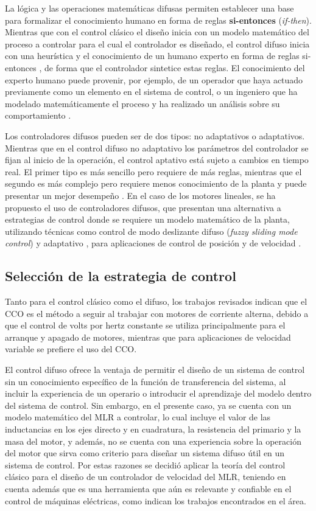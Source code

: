La lógica y las operaciones matemáticas difusas permiten establecer una base para formalizar el conocimiento humano en forma de reglas \textbf{si-entonces} (\textit{if-then}). Mientras que con el control clásico el diseño inicia con un modelo matemático del proceso a controlar para el cual el controlador es diseñado, el control difuso inicia con una heurística y el conocimiento de un humano experto en forma de reglas si-entonces \cite{wang1997}, de forma que el controlador sintetice estas reglas. El conocimiento del experto humano puede provenir, por ejemplo, de un operador que haya actuado previamente como un elemento en el sistema de control, o un ingeniero que ha modelado matemáticamente el proceso y ha realizado un análisis sobre su comportamiento \cite{passino1998}.

Los controladores difusos pueden ser de dos tipos: no adaptativos o adaptativos. Mientras que en el control difuso no adaptativo los parámetros del controlador se fijan al inicio de la operación, el control aptativo está sujeto a cambios en tiempo real. El primer tipo es más sencillo pero requiere de más reglas, mientras que el segundo es más complejo pero requiere menos conocimiento de la planta y puede presentar un mejor desempeño \cite{wang1997}. En el caso de los motores lineales, se ha propuesto el uso de controladores difusos, que presentan una alternativa a estrategias de control donde se requiere un modelo matemático de la planta, utilizando técnicas como control de modo deslizante difuso (\textit{fuzzy sliding mode control}) \cite{zhao2007} y adaptativo \cite{lin2008}, para aplicaciones de control de posición \cite{chen2011}\cite{chen2005} y de velocidad \cite{linsen2007}.

\subsection{Selección de la estrategia de control}

Tanto para el control clásico como el difuso, los trabajos revisados indican que el CCO es el método a seguir al trabajar con motores de corriente alterna, debido a que el control de volts por hertz constante se utiliza principalmente para el arranque y apagado de motores, mientras que para aplicaciones de velocidad variable se prefiere el uso del CCO.

El control difuso ofrece la ventaja de permitir el diseño de un sistema de control sin un conocimiento específico de la función de transferencia del sistema, al incluir la experiencia de un operario o introducir el aprendizaje del modelo dentro del sistema de control. Sin embargo, en el presente caso, ya se cuenta con un modelo matemático del MLR a controlar, lo cual incluye el valor de las inductancias en los ejes directo y en cuadratura, la resistencia del primario y la masa del motor, y además, no se cuenta con una experiencia sobre la operación del motor que sirva como criterio para diseñar un sistema difuso útil en un sistema de control. Por estas razones se decidió aplicar la teoría del control clásico para el diseño de un controlador de velocidad del MLR, teniendo en cuenta además que es una herramienta que aún es relevante y confiable en el control de máquinas eléctricas, como indican los trabajos encontrados en el área.


